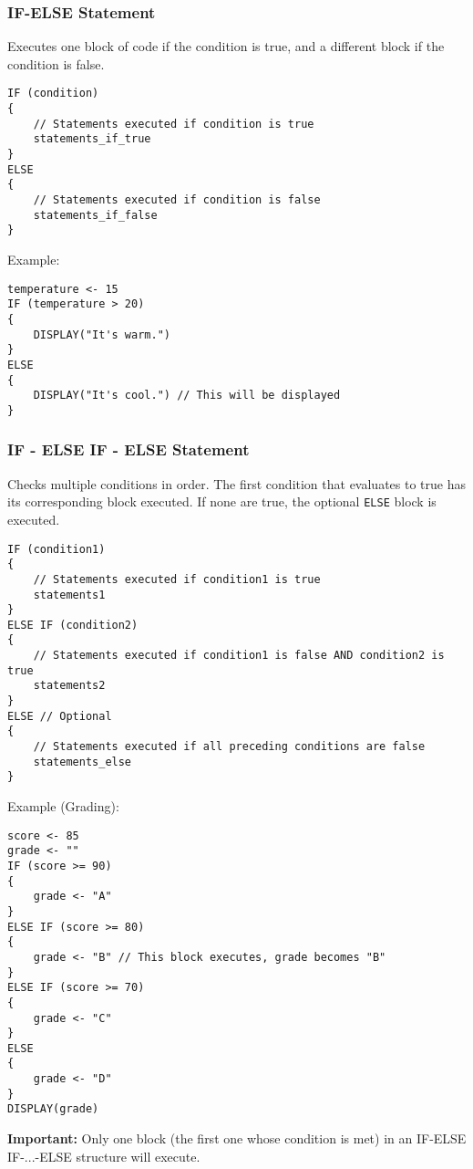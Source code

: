 \documentclass[11pt,oneside]{book}
\begin{document}
\subsubsection*{IF-ELSE Statement}
Executes one block of code if the condition is true, and a different block if the condition is false.
\begin{lstlisting}[language=APCSP, label={lst:if_else}, caption={AP Pseudocode: IF-ELSE}]
IF (condition)
{
    // Statements executed if condition is true
    statements_if_true
}
ELSE
{
    // Statements executed if condition is false
    statements_if_false
}
\end{lstlisting}
Example:
\begin{lstlisting}[language=APCSP]
temperature <- 15
IF (temperature > 20)
{
    DISPLAY("It's warm.")
}
ELSE
{
    DISPLAY("It's cool.") // This will be displayed
}
\end{lstlisting}

\subsubsection*{IF - ELSE IF - ELSE Statement}
Checks multiple conditions in order. The first condition that evaluates to true has its corresponding block executed. If none are true, the optional \texttt{ELSE} block is executed.
\begin{lstlisting}[language=APCSP, label={lst:if_elseif_else}, caption={AP Pseudocode: IF - ELSE IF - ELSE}]
IF (condition1)
{
    // Statements executed if condition1 is true
    statements1
}
ELSE IF (condition2)
{
    // Statements executed if condition1 is false AND condition2 is true
    statements2
}
ELSE // Optional
{
    // Statements executed if all preceding conditions are false
    statements_else
}
\end{lstlisting}
Example (Grading):
\begin{lstlisting}[language=APCSP, label={lst:grading_example}]
score <- 85
grade <- ""
IF (score >= 90)
{
    grade <- "A"
}
ELSE IF (score >= 80)
{
    grade <- "B" // This block executes, grade becomes "B"
}
ELSE IF (score >= 70)
{
    grade <- "C"
}
ELSE
{
    grade <- "D"
}
DISPLAY(grade)
\end{lstlisting}
\textbf{Important:} Only one block (the first one whose condition is met) in an IF-ELSE IF-...-ELSE structure will execute.
\end{document}
